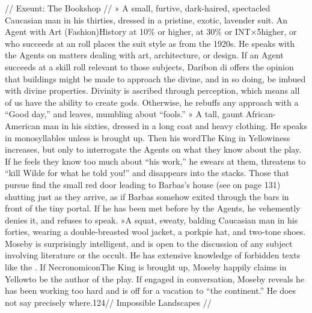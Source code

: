 \documentclass{report}
\begin{document}
\begin{multicols}{2}
// Exeunt: The Bookshop // » A small, furtive, dark-haired, spectacled Caucasian man in his thirties, dressed in a pristine, exotic, lavender suit. An Agent with Art (Fashion)History at 10\% or higher,  at 30\% or INT×5higher, or who succeeds at an  roll places the suit style as from the 1920s. He speaks with the Agents on matters dealing with art, architecture, or design. If an Agent succeeds at a skill roll relevant to those subjects, Daribon di offers the opinion that buildings might be made to approach the divine, and in so doing, be imbued with divine properties. Divinity is ascribed through perception, which means all of us have the ability to create gods. Otherwise, he rebuffs any approach with a “Good day,” and leaves, mumbling about “fools.” » A tall, gaunt African-American man in his sixties, dressed in a long coat and heavy clothing. He speaks in monosyllables unless  is brought up. Then his wordThe King in Yellowiness increases, but only to interrogate the Agents on what they know about the play. If he feels they know too much about “his work,” he swears at them, threatens to “kill Wilde for what he told you!” and disappears into the stacks. Those that pursue find the small red door leading to Barbas's  house (see on page 131) shutting just as they arrive, as if Barbas somehow exited through the bars in front of the tiny portal. If he has been met before by the Agents, he vehemently denies it, and refuses to speak. »A squat, sweaty, balding Caucasian man in his forties, wearing a double-breasted wool jacket, a porkpie hat, and two-tone shoes. Moseby is surprisingly intelligent, and is open to the discussion of any subject involving literature or the occult. He has extensive knowledge of forbidden texts like the . If NecronomiconThe King  is brought up, Moseby happily claims in Yellowto be the author of the play. If engaged in conversation, Moseby reveals he has been working too hard and is off for a vacation to “the continent.” He does not say precisely where.124// Impossible Landscapes //

\end{multicols}
\end{document}
